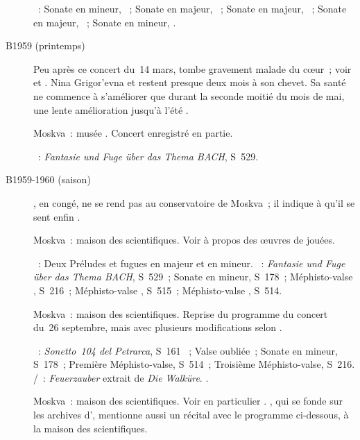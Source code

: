 \begin{description}
 \textsc{\Beethoven{}}~: Sonate  en \kC mineur, 
 ~; Sonate  en \kD majeur,  ~; Sonate
  en \kG majeur, ~; Sonate  en \kF \Sharp
 majeur, ~; Sonate  en \kC mineur, .
 \item[B1959 (printemps)]
 Peu après ce concert du~14 mars, \VSofronitsky{} tombe gravement malade du
 cœur~; voir \citet[p.~379-380]{Shiryaeva} et \citet[p.~181]{Nekrasova08}.
 Nina Grigor'evna \citeauthor{Shiryaeva} et \AVizel{} restent presque deux
 mois à son chevet.
 Sa santé ne commence à s'améliorer que durant la seconde moitié du mois de
 mai, une lente amélioration jusqu'à l'été \citep[voir][p.~411]{Shiryaeva}.
 \item[\DateWithWeekDay{1959-08-17}]
 Moskva~: musée \Scriabine{}.
 Concert enregistré en partie.

 \textsc{\Liszt{}}~: \emph{Fantasie und Fuge über das Thema BACH}, S~529.
 \item[B1959-1960 (saison)]
 \VSofronitsky{}, en congé, ne se rend pas au conservatoire de Moskva~; il
 indique à \citet[p.~416]{Shiryaeva} qu'il se sent enfin .
 \item[\DateWithWeekDay{1959-09-26}]
 Moskva~: maison des scientifiques.
 Voir \citet[p.~396]{Shiryaeva} à propos des œuvres de \JBach{} jouées.

 \textsc{\JBach{}}~: Deux Préludes et fugues en \kB \Flat majeur et en \kB
 \Flat mineur.
 \textsc{\Liszt{}}~: \emph{Fantasie und Fuge über das Thema BACH}, S~529~;
 Sonate en \kB mineur, S~178~; Méphisto-valse , S~216~;
 Méphisto-valse , S~515~; Méphisto-valse , S~514.
 \item[\DateWithWeekDay{1959-09-29}]
 Moskva~: maison des scientifiques.
 Reprise du programme du concert du~26 septembre, mais avec plusieurs
 modifications selon \citet[p.~182]{Nekrasova08}.

 \textsc{\Liszt{}}~: \emph{Sonetto~104 del Petrarca}, S~161 ~;
 Valse oubliée~; Sonate en \kB mineur, S~178~; Première Méphisto-valse,
 S~514~; Troisième Méphisto-valse, S~216.
 \textsc{\Wagner{}/\Brassin{}}~: \emph{Feuerzauber} extrait de \emph{Die
 Walküre}.
 \textsc{\Scriabine{}}.
 \item[\DateWithWeekDay{1959-10-16}]
 Moskva~: maison des scientifiques.
 Voir en particulier \citet[p.~446]{Milshteyn82a}.
 \citet[p.~181]{Nekrasova08}, qui se fonde sur les archives d'\AVizel{},
 mentionne aussi un récital avec le programme ci-dessous, à la maison des
 scientifiques.


\end{description}
